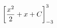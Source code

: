 \documentclass[preview]{standalone}
\begin{document}
\begin{align*}
\special{dvisvgm:raw <g id='unique000'>}\left[\frac{x^2}{2} + x + C\right]_{-3}^{3}\special{dvisvgm:raw </g>}
\end{align*}
\end{document}
